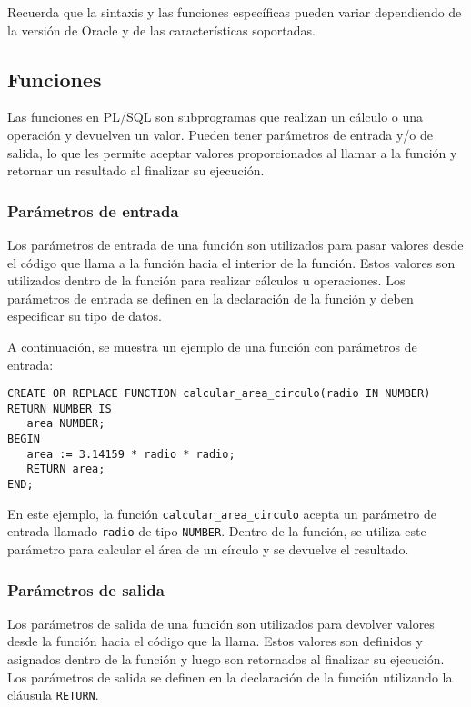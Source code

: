 \documentclass[executivepaper]{article}
\begin{document}
Recuerda que la sintaxis y las funciones específicas pueden variar dependiendo de la versión de Oracle y de las características soportadas.

\subsection{Funciones}

Las funciones en PL/SQL son subprogramas que realizan un cálculo o una operación y devuelven un valor. Pueden tener parámetros de entrada y/o de salida, lo que les permite aceptar valores proporcionados al llamar a la función y retornar un resultado al finalizar su ejecución.

\subsubsection*{Parámetros de entrada}

Los parámetros de entrada de una función son utilizados para pasar valores desde el código que llama a la función hacia el interior de la función. Estos valores son utilizados dentro de la función para realizar cálculos u operaciones. Los parámetros de entrada se definen en la declaración de la función y deben especificar su tipo de datos.

A continuación, se muestra un ejemplo de una función con parámetros de entrada:

\begin{lstlisting}
CREATE OR REPLACE FUNCTION calcular_area_circulo(radio IN NUMBER) RETURN NUMBER IS
   area NUMBER;
BEGIN
   area := 3.14159 * radio * radio;
   RETURN area;
END;
\end{lstlisting}

En este ejemplo, la función \texttt{calcular\_area\_circulo} acepta un parámetro de entrada llamado \texttt{radio} de tipo \texttt{NUMBER}. Dentro de la función, se utiliza este parámetro para calcular el área de un círculo y se devuelve el resultado.

\subsubsection*{Parámetros de salida}

Los parámetros de salida de una función son utilizados para devolver valores desde la función hacia el código que la llama. Estos valores son definidos y asignados dentro de la función y luego son retornados al finalizar su ejecución. Los parámetros de salida se definen en la declaración de la función utilizando la cláusula \texttt{RETURN}.
\end{document}

